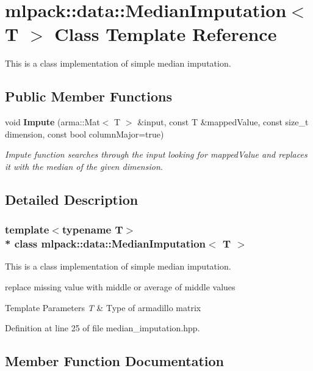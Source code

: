 \section{mlpack\+:\+:data\+:\+:Median\+Imputation$<$ T $>$ Class Template Reference}
\label{classmlpack_1_1data_1_1MedianImputation}


This is a class implementation of simple median imputation.  


\subsection*{Public Member Functions}
\begin{DoxyCompactItemize}
\item 
void {\bf Impute} (arma\+::\+Mat$<$ T $>$ \&input, const T \&mapped\+Value, const size\+\_\+t dimension, const bool column\+Major=true)
\begin{DoxyCompactList}\small\item\em Impute function searches through the input looking for mapped\+Value and replaces it with the median of the given dimension. \end{DoxyCompactList}\end{DoxyCompactItemize}


\subsection{Detailed Description}
\subsubsection*{template$<$typename T$>$\\*
class mlpack\+::data\+::\+Median\+Imputation$<$ T $>$}

This is a class implementation of simple median imputation. 

replace missing value with middle or average of middle values 
\begin{DoxyTemplParams}{Template Parameters}
{\em T} & Type of armadillo matrix \\
\hline
\end{DoxyTemplParams}


Definition at line 25 of file median\+\_\+imputation.\+hpp.



\subsection{Member Function Documentation}
